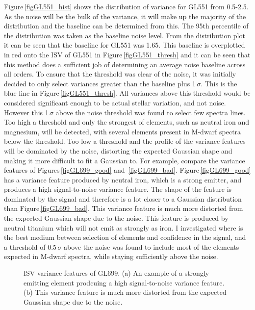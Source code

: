 Figure\,\ref{figGL551_hist} shows the distribution of variance for GL551 from 0.5-2.5. As the noise will be the bulk of the variance, it will make up the majority of the distribution and the baseline can be determined from this. The 95th percentile of the distribution was taken as the baseline noise level. From the distribution plot it can be seen that the baseline for GL551 was 1.65. This baseline is overplotted in red onto the ISV of GL551 in Figure\,\ref{figGL551_thresh} and it can be seen that this method does a sufficient job of determining an average noise baseline across all orders. To ensure that the threshold was clear of the noise, it was initially decided to only select variances greater than the baseline plus 1\,$\sigma$. This is the blue line in Figure\,\ref{figGL551_thresh}. All variances above this threshold would be considered significant enough to be actual stellar variation, and not noise. However this 1\,$\sigma$ above the noise threshold was found to select few spectra lines. Too high a threshold and only the strongest of elements, such as neutral iron and magnesium, will be detected, with several elements present in M-dwarf spectra below the threshold. Too low a threshold and the profile of the variance features will be dominated by the noise, distorting the expected Gaussian shape and making it more difficult to fit a Gaussian to. For example, compare the variance features of Figures\,\ref{figGL699_good} and \,\ref{figGL699_bad}. Figure\,\ref{figGL699_good} has a variance feature produced by neutral iron, which is a strong emitter, and produces a high signal-to-noise variance feature. The shape of the feature is dominated by the signal and therefore is a lot closer to a Gaussian distribution than Figure\,\ref{figGL699_bad}. This variance feature is much more distorted from the expected Gaussian shape due to the noise. This feature is produced by neutral titanium which will not emit as strongly as iron. I investigated where is the best medium between selection of elements and confidence in the signal, and a threshold of 0.5\,$\sigma$ above the noise was found to include most of the elements expected in M-dwarf spectra, while staying sufficiently above the noise.\\

\begin{figure}
	\hspace{-2cm}
	\captionsetup{width=.8\textwidth}
    \caption{ISV variance features of GL699. (a) An example of a strongly emitting element prodcuing a high signal-to-noise variance feature. (b) This variance feature is much more distorted from the expected Gaussian shape due to the noise.}
\end{figure}

